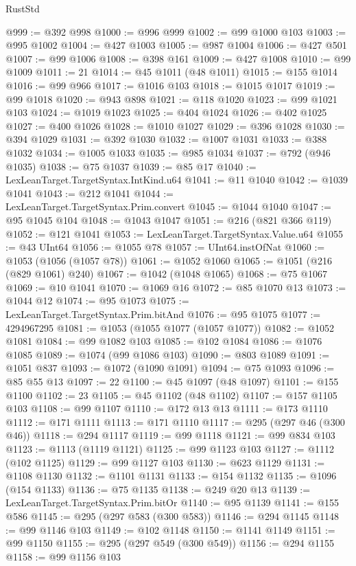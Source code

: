\begin{lexlean}{RustStd}
\begin{coremodule}
@999 := @392 @998
@1000 := @996 @999
@1002 := @99 @1000 @103
@1003 := @995 @1002
@1004 := @427 @1003
@1005 := @987 @1004
@1006 := @427 @501
@1007 := @99 @1006
@1008 := @398 @161
@1009 := @427 @1008
@1010 := @99 @1009
@1011 := 21
@1014 := @45 @1011 (@48 @1011)
@1015 := @155 @1014
@1016 := @99 @966
@1017 := @1016 @103
@1018 := @1015 @1017
@1019 := @99 @1018
@1020 := @943 @898
@1021 := @118 @1020
@1023 := @99 @1021 @103
@1024 := @1019 @1023
@1025 := @404 @1024
@1026 := @402 @1025
@1027 := @400 @1026
@1028 := @1010 @1027
@1029 := @396 @1028
@1030 := @394 @1029
@1031 := @392 @1030
@1032 := @1007 @1031
@1033 := @388 @1032
@1034 := @1005 @1033
@1035 := @985 @1034
@1037 := @792 (@946 @1035)
@1038 := @75 @1037
@1039 := @85 @17
@1040 := LexLeanTarget.TargetSyntax.IntKind.u64
@1041 := @11 @1040
@1042 := @1039 @1041
@1043 := @212 @1041
@1044 := LexLeanTarget.TargetSyntax.Prim.convert
@1045 := @1044 @1040
@1047 := @95 @1045 @104
@1048 := @1043 @1047
@1051 := @216 (@821 @366 @119)
@1052 := @121 @1041
@1053 := LexLeanTarget.TargetSyntax.Value.u64
@1055 := @43 UInt64
@1056 := @1055 @78
@1057 := UInt64.instOfNat
@1060 := @1053 (@1056 (@1057 @78))
@1061 := @1052 @1060
@1065 := @1051 (@216 (@829 @1061) @240)
@1067 := @1042 (@1048 @1065)
@1068 := @75 @1067
@1069 := @10 @1041
@1070 := @1069 @16
@1072 := @85 @1070 @13
@1073 := @1044 @12
@1074 := @95 @1073
@1075 := LexLeanTarget.TargetSyntax.Prim.bitAnd
@1076 := @95 @1075
@1077 := 4294967295
@1081 := @1053 (@1055 @1077 (@1057 @1077))
@1082 := @1052 @1081
@1084 := @99 @1082 @103
@1085 := @102 @1084
@1086 := @1076 @1085
@1089 := @1074 (@99 @1086 @103)
@1090 := @803 @1089
@1091 := @1051 @837
@1093 := @1072 (@1090 @1091)
@1094 := @75 @1093
@1096 := @85 @55 @13
@1097 := 22
@1100 := @45 @1097 (@48 @1097)
@1101 := @155 @1100
@1102 := 23
@1105 := @45 @1102 (@48 @1102)
@1107 := @157 @1105 @103
@1108 := @99 @1107
@1110 := @172 @13 @13
@1111 := @173 @1110
@1112 := @171 @1111
@1113 := @171 @1110
@1117 := @295 (@297 @46 (@300 @46))
@1118 := @294 @1117
@1119 := @99 @1118
@1121 := @99 @834 @103
@1123 := @1113 (@1119 @1121)
@1125 := @99 @1123 @103
@1127 := @1112 (@102 @1125)
@1129 := @99 @1127 @103
@1130 := @623 @1129
@1131 := @1108 @1130
@1132 := @1101 @1131
@1133 := @154 @1132
@1135 := @1096 (@154 @1133)
@1136 := @75 @1135
@1138 := @249 @20 @13
@1139 := LexLeanTarget.TargetSyntax.Prim.bitOr
@1140 := @95 @1139
@1141 := @155 @586
@1145 := @295 (@297 @583 (@300 @583))
@1146 := @294 @1145
@1148 := @99 @1146 @103
@1149 := @102 @1148
@1150 := @1141 @1149
@1151 := @99 @1150
@1155 := @295 (@297 @549 (@300 @549))
@1156 := @294 @1155
@1158 := @99 @1156 @103

\end{coremodule}
\end{lexlean}
